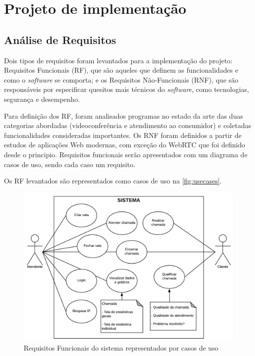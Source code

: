 \chapter[Projeto de implementação]{Projeto de implementação}\label{chap:projeto}


\section{Análise de Requisitos}

Dois tipos de requisitos foram levantados para a implementação do projeto: Requisitos Funcionais (RF), que são aqueles que definem as funcionalidades e como o \textit{software} se comporta; e os Requisitos Não-Funcionais (RNF), que são responsáveis por especificar quesitos mais técnicos do \textit{software}, como tecnologias, segurança e desempenho. 

Para definição dos RF, foram analisados programas no estado da arte das duas categorias abordadas (videoconferência e atendimento ao consumidor) e coletadas funcionalidades consideradas importantes. Os RNF foram definidos a partir de estudos de aplicações Web modernas, com exceção do WebRTC que foi definido desde o principio. Requisitos funcionais serão apresentados com um diagrama de casos de uso, sendo cada caso um requisito. 

Os RF levantados são representados como casos de uso na \autoref{fig:usecases}.

\begin{figure}[ht!]
	\centering
    \includegraphics[scale=0.4]{figures/usecases.png} 
	\caption{Requisitos Funcionais do sistema representados por casos de uso}
	\label{fig:usecases}
\end{figure}

